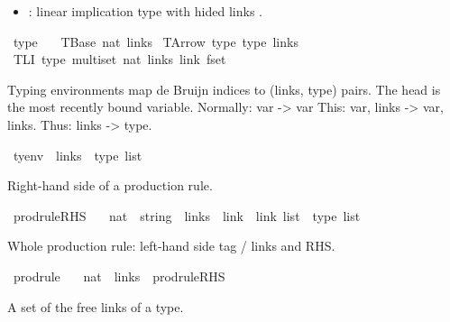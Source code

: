 \begin{isabellebody}
\begin{isamarkuptext}
\begin{itemize}
\item {} : linear implication type with hided links .%
\end{itemize}%
\end{isamarkuptext}\isamarkuptrue%
\isamarkupfalse%
\ type\ {\isacharequal}{\kern0pt}\isanewline
\ \ TBase\ nat\ links\isanewline
{\isacharbar}{\kern0pt}\ TArrow\ type\ type\ links\isanewline
{\isacharbar}{\kern0pt}\ TLI\ {\isachardoublequoteopen}{\isacharparenleft}{\kern0pt}type\ multiset{\isacharparenright}{\kern0pt}{\isachardoublequoteclose}\ nat\ links\ {\isachardoublequoteopen}link\ fset{\isachardoublequoteclose}%
\begin{isamarkuptext}%
Typing environments map de Bruijn indices to (links, type) pairs.
The head is the most recently bound variable.
Normally: var -> var
This: var, links -> var, links.
Thus: links -> type.%
\end{isamarkuptext}\isamarkuptrue%
\isamarkupfalse%
\ tyenv\ {\isacharequal}{\kern0pt}\ {\isachardoublequoteopen}{\isacharparenleft}{\kern0pt}links\ {\isacharasterisk}{\kern0pt}\ type{\isacharparenright}{\kern0pt}\ list{\isachardoublequoteclose}%
\begin{isamarkuptext}%
Right-hand side of a production rule.%
\end{isamarkuptext}\isamarkuptrue%
\isamarkupfalse%
\ prodrule{\isacharunderscore}{\kern0pt}RHS\ {\isacharequal}{\kern0pt}\isanewline
\ \ {\isachardoublequoteopen}nat\ {\isacharasterisk}{\kern0pt}\ {\isacharparenleft}{\kern0pt}string\ {\isacharasterisk}{\kern0pt}\ links{\isacharparenright}{\kern0pt}\ {\isacharasterisk}{\kern0pt}\ {\isacharparenleft}{\kern0pt}link\ {\isacharasterisk}{\kern0pt}\ link{\isacharparenright}{\kern0pt}\ list\ {\isacharasterisk}{\kern0pt}\ type\ list{\isachardoublequoteclose}%
\begin{isamarkuptext}%
Whole production rule: left-hand side tag / links and RHS.%
\end{isamarkuptext}\isamarkuptrue%
\isamarkupfalse%
\ prodrule\ {\isacharequal}{\kern0pt}\isanewline
\ \ {\isachardoublequoteopen}{\isacharparenleft}{\kern0pt}nat\ {\isacharasterisk}{\kern0pt}\ links{\isacharparenright}{\kern0pt}\ {\isacharasterisk}{\kern0pt}\ prodrule{\isacharunderscore}{\kern0pt}RHS{\isachardoublequoteclose}%
\begin{isamarkuptext}%
A set of the free links of a type.%

\end{isamarkuptext}
\end{isabellebody}
